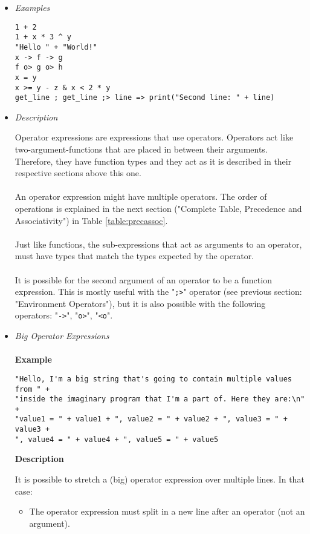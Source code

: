 \documentclass{article}
\begin{document}
\begin{itemize}
\item \textit{Examples}
\begin{verbatim}
1 + 2
1 + x * 3 ^ y
"Hello " + "World!"
x -> f -> g
f o> g o> h
x = y
x >= y - z & x < 2 * y
get_line ; get_line ;> line => print("Second line: " + line)
\end{verbatim}

\item \textit{Description}

Operator expressions are expressions that use operators. Operators act like
two-argument-functions that are placed in between their arguments. Therefore,
they have function types and they act as it is described in their respective
sections above this one.
\\\\
An operator expression might have multiple operators. The order of operations
is explained in the next section ("Complete Table, Precedence and Associativity")
in Table \ref{table:precassoc}.
\\\\
Just like functions, the sub-expressions
that act as arguments to an operator, must have types that match the types 
expected by the operator.
\\\\
It is possible for the second argument of an operator to be a function expression.
This is mostly useful with the "\texttt{;>}" operator (see previous section:
"Environment Operators"), but it is also possible with the following operators:
"\texttt{->}", "\texttt{o>}", "\texttt{<o}".

\item \textit{Big Operator Expressions}\\\\
\textbf{Example}

\begin{verbatim}
"Hello, I'm a big string that's going to contain multiple values from " +
"inside the imaginary program that I'm a part of. Here they are:\n" +
"value1 = " + value1 + ", value2 = " + value2 + ", value3 = " + value3 + 
", value4 = " + value4 + ", value5 = " + value5
\end{verbatim}

\textbf{Description}

It is possible to stretch a (big) operator expression over multiple lines.
In that case:
\begin{itemize}
\item
The operator expression must split in a new line after an operator (not an
argument).


\end{itemize}
\end{itemize}
\end{document}
